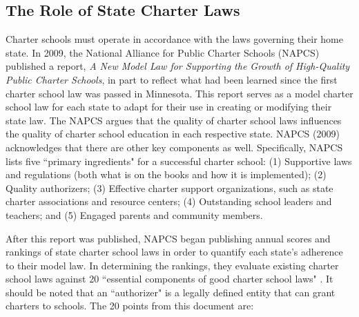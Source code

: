\documentclass[letterpaper,12pt]{article} %
\begin{document}
\subsection{The Role of State Charter Laws}

Charter schools must operate in accordance with the laws governing their home state. In 2009, the National Alliance for Public Charter Schools (NAPCS) published a report, \textit{A New Model Law for Supporting the Growth of High-Quality Public Charter Schools}, in part to reflect what had been learned since the first charter school law was passed in Minnesota. This report serves as a model charter school law for each state to adapt for their use in creating or modifying their state law. The NAPCS argues that the quality of charter school laws influences the quality of charter school education in each respective state. NAPCS (2009) acknowledges that there are other key components as well. Specifically, NAPCS lists five ``primary ingredients" \cite[p. 1]{NAPCS2009} for a successful charter school: (1) Supportive laws and regulations (both what is on the books and how it is implemented); (2) Quality authorizers; (3) Effective charter support organizations, such as state charter associations and resource centers; (4) Outstanding school leaders and teachers; and (5) Engaged parents and community members.

After this report was published, NAPCS began publishing annual scores and rankings of state charter school laws in order to quantify each state's adherence to their model law. In determining the rankings, they evaluate existing charter school laws against 20 ``essential components of good charter school laws" \cite[pp. 6--7]{NAPCS2012}. It should be noted that an ``authorizer" is a legally defined entity that can grant charters to schools. The 20 points from this document are:
\end{document}
